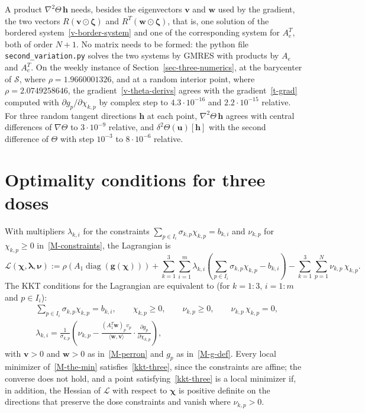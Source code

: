 \documentclass[11pt]{article}
\theoremstyle{plain}
\theoremstyle{remark}
\numberwithin{equation}{section}
\begin{document}
A product $\nabla^2\Theta\,\bm h$ needs, besides the eigenvectors
$\bm v$ and $\bm w$ used by the gradient, the two vectors
$R\left(\bm v\odot\bm\zeta\right)$ and $R^T\left(\bm w\odot\bm\zeta\right)$,
that is, one solution of the bordered system~\eqref{v-border-system} and one of the
corresponding system for $A_e^T$, both of order $N+1$. No matrix needs to be
formed: the python file \texttt{second\_variation.py} solves the two systems
by GMRES with products by $A_e$ and $A_e^T$. On the weekly instance of
Section~\ref{sec-three-numerics}, at the barycenter of $\mathcal{S}$, where
$\rho=1.9660001326$, and at a random interior point, where
$\rho=2.0749258646$, the gradient~\eqref{v-theta-derivs} agrees with the
gradient~\eqref{t-grad} computed with $\partial g_p/\partial\chi_{k,p}$ by
complex step to $4.3\cdot 10^{-16}$ and $2.2\cdot 10^{-15}$ relative. For three
random tangent directions $\bm h$ at each point, $\nabla^2\Theta\,\bm h$ agrees
with central differences of $\nabla\Theta$ to $3\cdot 10^{-9}$ relative, and
$\delta^2\Theta(\bm u)[\bm h]$ with the second difference of $\Theta$ with step
$10^{-3}$ to $8\cdot 10^{-6}$ relative.

\section{Optimality conditions for three doses}\label{sec-kkt-three}

With multipliers $\lambda_{k,i}$ for the constraints
$\sum_{p\in I_i}\sigma_{k,p}\chi_{k,p}=b_{k,i}$ and $\nu_{k,p}$ for
$\chi_{k,p}\ge 0$ in~\eqref{M-constraints}, the Lagrangian is
\begin{equation}\label{lagrangian-three}
\mathcal{L}(\bm\chi,\bm\lambda,\bm\nu):=\rho\left(A_1\operatorname{diag}\left(\bm g(\bm\chi)\right)\right)
+\sum_{k=1}^3\sum_{i=1}^m\lambda_{k,i}\left(\sum_{p\in I_i}\sigma_{k,p}\chi_{k,p}-b_{k,i}\right)
-\sum_{k=1}^3\sum_{p=1}^N\nu_{k,p}\,\chi_{k,p}.
\end{equation}
The KKT conditions for the Lagrangian are equivalent to (for $k=1:3$, $i=1:m$ and $p\in I_i$):
\begin{equation}\label{kkt-three}
\begin{aligned}
&\sum_{p\in I_i}\sigma_{k,p}\chi_{k,p}=b_{k,i},\qquad \chi_{k,p}\ge 0,\qquad \nu_{k,p}\ge 0,\qquad \nu_{k,p}\,\chi_{k,p}=0,\\
&\lambda_{k,i}=\frac{1}{\sigma_{k,p}}\left(\nu_{k,p}-
\frac{\left(A_1^T\bm w\right)_pv_p}{\langle\bm w,\bm v\rangle}\cdot
\frac{\partial g_p}{\partial\chi_{k,p}}\right),
\end{aligned}
\end{equation}
with $\bm v>0$ and $\bm w>0$ as in~\eqref{M-perron} and $g_p$ as
in~\eqref{M-g-def}.
Every local minimizer of~\eqref{M-the-min} satisfies~\eqref{kkt-three}, since
the constraints are affine; the converse does not hold, and a point
satisfying~\eqref{kkt-three} is a local minimizer if, in addition, the Hessian
of $\mathcal{L}$ with respect to $\bm\chi$ is positive definite on the
directions that preserve the dose constraints and vanish where $\nu_{k,p}>0$.
\end{document}
